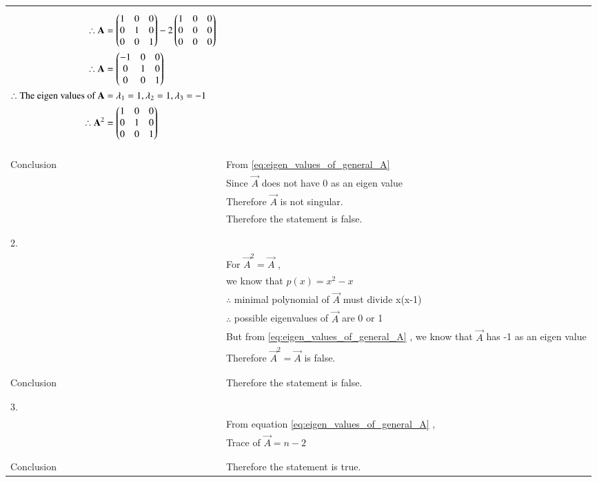 \documentclass[journal,12pt]{IEEEtran}
\begin{document}
\begin{longtable}{|l|l|}
{\begin{align}
    \therefore \mathbf{A}&=\begin{pmatrix}1&0&0\\0&1&0\\0&0&1\end{pmatrix}-2\begin{pmatrix}1&0&0\\0&0&0\\0&0&0\end{pmatrix}\\
    \therefore \mathbf{A}&=\begin{pmatrix}-1&0&0\\0&1&0\\0&0&1\end{pmatrix}\\
    \therefore \mbox{The eigen values of }\mathbf{A}&=\lambda_1=1,\lambda_2=1,\lambda_3=-1\\
    \therefore \mathbf{A}^2&=\begin{pmatrix}1&0&0\\0&1&0\\0&0&1\end{pmatrix}
\end{align}}\\
&\\
\hline
&\\
Conclusion&From \eqref{eq:eigen_values_of_general_A}\\
&Since $\vec{A}$ does not have 0 as an eigen value\\
&Therefore $\vec{A}$ is not singular.\\
&Therefore the statement is false.\\
&\\
\hline
&\\
2.&\\
& For $\vec{A}^2=\vec{A}$ ,\\
&we know that $p(x)=x^2-x$\\
&$\therefore$ minimal polynomial of $\vec{A}$ must divide x(x-1)\\
&$\therefore$ possible eigenvalues of $\vec{A}$ are 0 or 1\\
&But from \eqref{eq:eigen_values_of_general_A} , we know that $\vec{A}$ has -1 as an eigen value\\
&Therefore $\vec{A}^2=\vec{A}$ is false.\\
&\\
\hline
&\\
Conclusion&Therefore the statement is false.\\
&\\
\hline
\pagebreak
\hline
&\\
3.&\\
& From equation \eqref{eq:eigen_values_of_general_A} ,\\
&Trace of $\vec{A}=n-2$\\
&\\
\hline
&\\
Conclusion&Therefore the statement is true.\\

\end{longtable}
\end{document}
